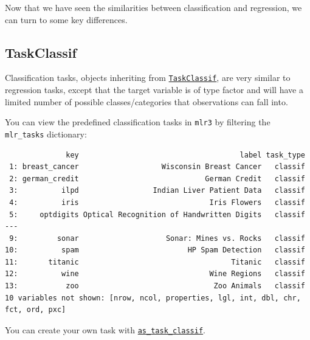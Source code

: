 Now that we have seen the similarities between classification and
regression, we can turn to some key differences.

\hypertarget{taskclassif}{%
\subsection{TaskClassif}\label{taskclassif}}

Classification tasks, objects inheriting from
\href{https://mlr3.mlr-org.com/reference/TaskClassif.html}{\texttt{TaskClassif}},
are very similar to regression tasks, except that the target variable is
of type factor and will have a limited number of possible
classes/categories that observations can fall into.

You can view the predefined classification tasks in \texttt{mlr3} by
filtering the \texttt{mlr\_tasks} dictionary:

\begin{Shaded}
\begin{Highlighting}[]
\NormalTok{(mlr\_tasks)[task\_type }\SpecialCharTok{==} \NormalTok{]}
\end{Highlighting}
\end{Shaded}

\begin{verbatim}
              key                                     label task_type
 1: breast_cancer                   Wisconsin Breast Cancer   classif
 2: german_credit                             German Credit   classif
 3:          ilpd                 Indian Liver Patient Data   classif
 4:          iris                              Iris Flowers   classif
 5:     optdigits Optical Recognition of Handwritten Digits   classif
---                                                                  
 9:         sonar                    Sonar: Mines vs. Rocks   classif
10:          spam                         HP Spam Detection   classif
11:       titanic                                   Titanic   classif
12:          wine                              Wine Regions   classif
13:           zoo                               Zoo Animals   classif
10 variables not shown: [nrow, ncol, properties, lgl, int, dbl, chr, fct, ord, pxc]
\end{verbatim}

You can create your own task with
\href{https://mlr3.mlr-org.com/reference/as_task_classif.html}{\texttt{as\_task\_classif}}.

